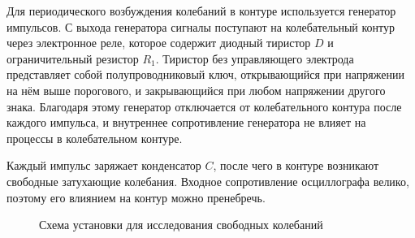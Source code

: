 Для периодического возбуждения колебаний в контуре используется генератор импульсов. С выхода генератора сигналы поступают на колебательный контур через электронное реле, которое содержит диодный тиристор $D$ и ограничительный резистор $R_1$. Тиристор без управляющего электрода представляет собой полупроводниковый ключ, открывающийся при напряжении на нём выше порогового, и закрывающийся при любом напряжении другого знака. Благодаря этому генератор отключается от колебательного контура после каждого импульса, и внутреннее сопротивление генератора не влияет на процессы в колебательном контуре.

Каждый импульс заряжает конденсатор $C$, после чего в контуре возникают свободные затухающие колебания. Входное сопротивление осциллографа велико, поэтому его влиянием на контур можно пренебречь.
\begin{figure}[h!]
	\caption{Схема установки для исследования свободных колебаний}
\end{figure}

